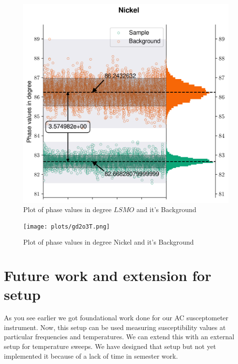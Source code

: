 \begin{figure}[hbt!]
  \includegraphics[width= \linewidth]{plots/nickelT.png}
  \caption{Plot of phase values in degree $LSMO$ and it's Background}
  \label{fig:Tdata3}
\end{figure}
\begin{figure}[hbt!]
  \texttt{[image: plots/gd2o3T.png]}
  \caption{Plot of phase values in degree Nickel and it's Background}
  \label{fig:Tdata4}
\end{figure}

\newpage
\section{Future work and extension for setup}

As you see earlier we got foundational work done for our AC susceptometer instrument. Now, this setup can be used measuring susceptibility values at particular frequencies and temperatures. We can extend this with an external setup for temperature sweeps. We have designed that setup but not yet implemented it because of a lack of time in semester work.

